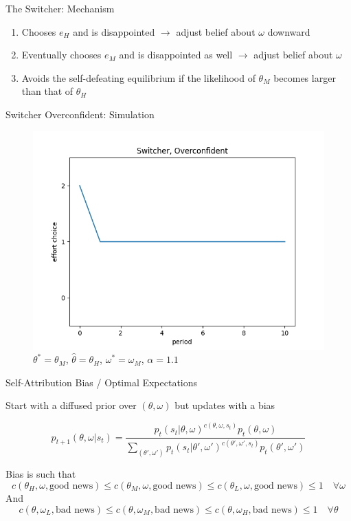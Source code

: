 \documentclass[aspectratio=169]{beamer}
\begin{document}
\begin{frame}{The Switcher: Mechanism}
    

    \begin{enumerate}
        \item Chooses $e_H$ and is disappointed $\rightarrow$ adjust belief about $\omega$ downward\\
        \bigskip
        \item Eventually chooses $e_M$ and is disappointed as well $\rightarrow$ adjust belief about $\omega$\\
        \bigskip
        \item Avoids the self-defeating equilibrium if the likelihood of $\theta_M$ becomes larger than that of $\theta_H$
    \end{enumerate}
    
    
\end{frame}

\begin{frame}{Switcher Overconfident: Simulation}
    \begin{figure}
        \centering
        \includegraphics[scale=.5]{switcher_over_11.png}
        \caption{$\theta^*=\theta_M$, $\hat\theta=\theta_H$, $\omega^*=\omega_M$, $\alpha= 1.1$}
    \end{figure}
\end{frame}


\begin{frame}{Self-Attribution Bias / Optimal Expectations}

    Start with a diffused prior over $(\theta, \omega)$ but updates with a bias

    $$ p_{t+1}(\theta, \omega| s_t)=\frac{p_t(s_t|\theta, \omega)^{c(\theta, \omega, s_t)}p_t(\theta, \omega)}{\sum_{(\theta', \omega')}p_t(s_t|\theta', \omega')^{c(\theta', \omega', s_t)}p_t(\theta', \omega')} $$

    Bias is such that 
    $$c(\theta_H, \omega, \text{good news}) \leq c(\theta_M, \omega, \text{good news}) \leq c(\theta_L, \omega, \text{good news})\leq1 \quad \forall \omega$$
    And
    $$c(\theta, \omega_L, \text{bad news}) \leq c(\theta, \omega_M, \text{bad news}) \leq c(\theta, \omega_H, \text{bad news})\leq1 \quad \forall \theta$$
    

\end{frame}
\end{document}
